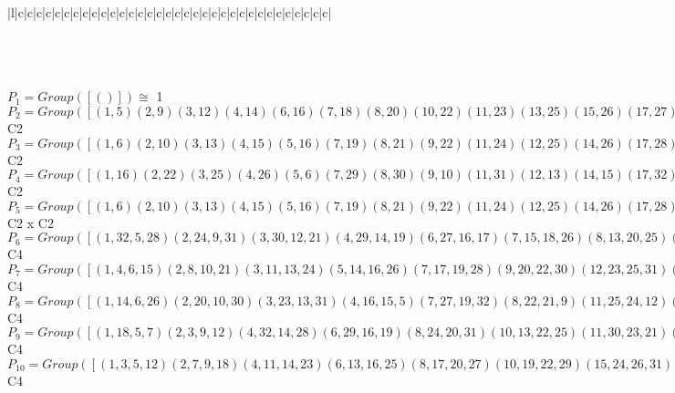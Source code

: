 \documentclass[varwidth=\maxdimen,border=10]{standalone}
\begin{document}
\begin{tabular}
\begin{array}{|l|c|c|c|c|c|c|c|c|c|c|c|c|c|c|c|c|c|c|c|c|c|c|c|c|c|c|c|c|c|c|c|c|c|c|}
\end{array}\)\\
\ \\
\ \\
$P_{1} = Group( [ () ] )\cong$ 1\ \\
$P_{2} = Group( [ ( 1, 5)( 2, 9)( 3,12)( 4,14)( 6,16)( 7,18)( 8,20)(10,22)(11,23)(13,25)(15,26)(17,27)(19,29)(21,30)(24,31)(28,32) ] )\cong$ C2\ \\
$P_{3} = Group( [ ( 1, 6)( 2,10)( 3,13)( 4,15)( 5,16)( 7,19)( 8,21)( 9,22)(11,24)(12,25)(14,26)(17,28)(18,29)(20,30)(23,31)(27,32) ] )\cong$ C2\ \\
$P_{4} = Group( [ ( 1,16)( 2,22)( 3,25)( 4,26)( 5, 6)( 7,29)( 8,30)( 9,10)(11,31)(12,13)(14,15)(17,32)(18,19)(20,21)(23,24)(27,28) ] )\cong$ C2\ \\
$P_{5} = Group( [ ( 1, 6)( 2,10)( 3,13)( 4,15)( 5,16)( 7,19)( 8,21)( 9,22)(11,24)(12,25)(14,26)(17,28)(18,29)(20,30)(23,31)(27,32), ( 1, 5)( 2, 9)( 3,12)( 4,14)( 6,16)( 7,18)( 8,20)(10,22)(11,23)(13,25)(15,26)(17,27)(19,29)(21,30)(24,31)(28,32) ] )\cong$ C2 x C2\ \\
$P_{6} = Group( [ ( 1,32, 5,28)( 2,24, 9,31)( 3,30,12,21)( 4,29,14,19)( 6,27,16,17)( 7,15,18,26)( 8,13,20,25)(10,11,22,23), ( 1, 5)( 2, 9)( 3,12)( 4,14)( 6,16)( 7,18)( 8,20)(10,22)(11,23)(13,25)(15,26)(17,27)(19,29)(21,30)(24,31)(28,32) ] )\cong$ C4\ \\
$P_{7} = Group( [ ( 1, 4, 6,15)( 2, 8,10,21)( 3,11,13,24)( 5,14,16,26)( 7,17,19,28)( 9,20,22,30)(12,23,25,31)(18,27,29,32), ( 1, 6)( 2,10)( 3,13)( 4,15)( 5,16)( 7,19)( 8,21)( 9,22)(11,24)(12,25)(14,26)(17,28)(18,29)(20,30)(23,31)(27,32) ] )\cong$ C4\ \\
$P_{8} = Group( [ ( 1,14, 6,26)( 2,20,10,30)( 3,23,13,31)( 4,16,15, 5)( 7,27,19,32)( 8,22,21, 9)(11,25,24,12)(17,29,28,18), ( 1, 6)( 2,10)( 3,13)( 4,15)( 5,16)( 7,19)( 8,21)( 9,22)(11,24)(12,25)(14,26)(17,28)(18,29)(20,30)(23,31)(27,32) ] )\cong$ C4\ \\
$P_{9} = Group( [ ( 1,18, 5, 7)( 2, 3, 9,12)( 4,32,14,28)( 6,29,16,19)( 8,24,20,31)(10,13,22,25)(11,30,23,21)(15,27,26,17), ( 1, 5)( 2, 9)( 3,12)( 4,14)( 6,16)( 7,18)( 8,20)(10,22)(11,23)(13,25)(15,26)(17,27)(19,29)(21,30)(24,31)(28,32) ] )\cong$ C4\ \\
$P_{10} = Group( [ ( 1, 3, 5,12)( 2, 7, 9,18)( 4,11,14,23)( 6,13,16,25)( 8,17,20,27)(10,19,22,29)(15,24,26,31)(21,28,30,32), ( 1, 5)( 2, 9)( 3,12)( 4,14)( 6,16)( 7,18)( 8,20)(10,22)(11,23)(13,25)(15,26)(17,27)(19,29)(21,30)(24,31)(28,32) ] )\cong$ C4\ \\

\end{tabular}
\end{document}
